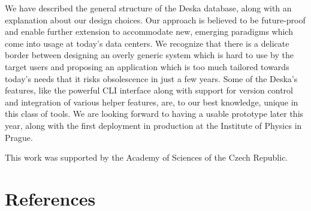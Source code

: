 \documentclass[a4paper]{jpconf}
\begin{document}
We have described the general structure of the Deska database, along with an explanation about our design choices.  Our approach is
believed to be future-proof and enable further extension to accommodate new, emerging paradigms which come into usage at today's data
centers.  We recognize that there is a delicate border between designing an overly generic system which is hard to use by the target
users and proposing an application which is too much tailored towards today's needs that it risks obsolescence in just a few years.
Some of the Deska's features, like the powerful CLI interface along with support for version control and integration of various helper
features, are, to our best knowledge, unique in this class of tools.  We are looking forward to having a usable prototype later this
year, along with the first deployment in production at the Institute of Physics in Prague.

\ack
This work was supported by the Academy of Sciences of the Czech Republic.

\section*{References}


\end{document}
